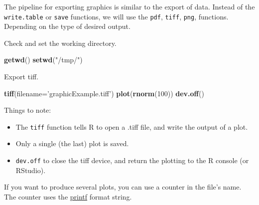 \documentclass[]{book}
\newenvironment{Shaded}{\begin{snugshade}}{\end{snugshade}}
\newcommand{\KeywordTok}[1]{\textcolor[rgb]{0.13,0.29,0.53}{\textbf{#1}}}
\newcommand{\DataTypeTok}[1]{\textcolor[rgb]{0.13,0.29,0.53}{#1}}
\newcommand{\DecValTok}[1]{\textcolor[rgb]{0.00,0.00,0.81}{#1}}
\newcommand{\StringTok}[1]{\textcolor[rgb]{0.31,0.60,0.02}{#1}}
\newcommand{\CommentTok}[1]{\textcolor[rgb]{0.56,0.35,0.01}{\textit{#1}}}
\newcommand{\NormalTok}[1]{#1}
\providecommand{\tightlist}{%
  \setlength{\itemsep}{0pt}\setlength{\parskip}{0pt}}
\theoremstyle{definition}
\theoremstyle{definition}
\theoremstyle{definition}
\theoremstyle{remark}
\begin{document}
The pipeline for exporting graphics is similar to the export of data.
Instead of the \texttt{write.table} or \texttt{save} functions, we will
use the \texttt{pdf}, \texttt{tiff}, \texttt{png}, functions. Depending
on the type of desired output.

Check and set the working directory.

\begin{Shaded}
\begin{Highlighting}[]
\KeywordTok{getwd}\NormalTok{()}
\KeywordTok{setwd}\NormalTok{(}\StringTok{"/tmp/"}\NormalTok{)}
\end{Highlighting}
\end{Shaded}

Export tiff.

\begin{Shaded}
\begin{Highlighting}[]
\KeywordTok{tiff}\NormalTok{(}\DataTypeTok{filename=}\StringTok{'graphicExample.tiff'}\NormalTok{)}
\KeywordTok{plot}\NormalTok{(}\KeywordTok{rnorm}\NormalTok{(}\DecValTok{100}\NormalTok{))}
\KeywordTok{dev.off}\NormalTok{()}
\end{Highlighting}
\end{Shaded}

Things to note:

\begin{itemize}
\tightlist
\item
  The \texttt{tiff} function tells R to open a .tiff file, and write the
  output of a plot.
\item
  Only a single (the last) plot is saved.
\item
  \texttt{dev.off} to close the tiff device, and return the plotting to
  the R console (or RStudio).
\end{itemize}

If you want to produce several plots, you can use a counter in the
file's name. The counter uses the
\href{https://en.wikipedia.org/wiki/Printf_format_string}{printf} format
string.

\begin{Shaded}
\end{Shaded}
\end{document}
